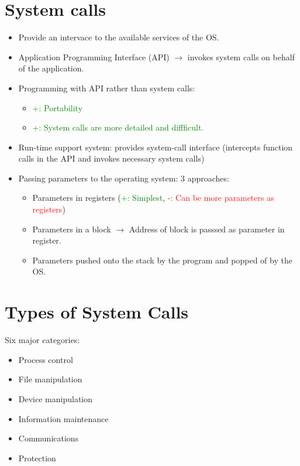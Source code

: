 \documentclass[10pt]{report}
\begin{document}
		\section{System calls}
  		\begin{itemize}
  			\item Provide an intervace to the available services of the OS.
  			\item Application Programming Interface (API) $\rightarrow$ invokes system calls on behalf of the application.
  			\item Programming with API rather than system calls:
  			\begin{itemize}
  				\item \textcolor{green}{+: Portability}
  				\item \textcolor{green}{+: System calls are more detailed and diffficult.}
  			\end{itemize}
  			\item Run-time support system: provides system-call interface (intercepts function calls in the API and invokes necessary system calls)
  			\item Passing parameters to the operating system: 3 approaches:
  			\begin{itemize}
  				\item Parameters in registers (\textcolor{green}{+: Simplest}, \textcolor{red}{-: Can be more parameters as registers})
  				\item Parameters in a block $\rightarrow$ Address of block is passsed as parameter in register.
  				\item Parameters pushed onto the stack by the program and popped of by the OS.
  			\end{itemize}
  		\end{itemize}

		\section{Types of System Calls}
  		Six major categories:
  		\begin{itemize}
  			\item Process control
  			\item File manipulation
  			\item Device manipulation
  			\item Information maintenance
  			\item Communications
  			\item Protection
  		\end{itemize}
\end{document}
